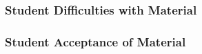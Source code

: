 \documentclass[10pt]{article}
\begin{document}
\begin{framed}
\subsubsection*{Student Difficulties with Material}
\begin{description}
    \item \uline{\hfill\null}
    \item \uline{\hfill\null}
    \item \uline{\hfill\null}
\end{description}

\subsubsection*{Student Acceptance of Material}
\begin{description}
    \item \uline{\hfill\null}
    \item \uline{\hfill\null}
    \item \uline{\hfill\null}
\end{description}
\vspace{0.2in}

\end{framed}

\vspace{0.2in}
\end{document}

